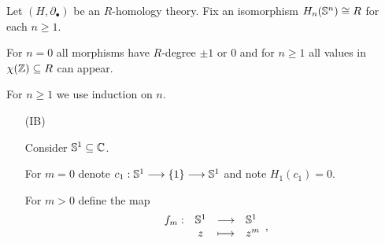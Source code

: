 	\begin{lemma}
		Let $(H,\partial_\bullet)$ be an $R$-homology theory. Fix an isomorphism $H_n(\S^n) \isom R$ for each $n \geq 1$.

		For $n = 0$ all morphisms have $R$-degree $\pm 1$ or $0$ and for $n \geq 1$  all values in $\chi(\Z) \subseteq R$ can appear. 
	\end{lemma}
	\begin{sketch}
		For $n \geq 1$ we use induction on $n$.
		\begin{enumerate}
			\item[(IB)]{
				Consider $\S^1 \subseteq \C$.

				For $m = 0$ denote $c_1: \S^1 --> \{1\} --> \S^1$ and note $H_1(c_1) = 0$.

				For $m > 0$ define the map 
				\begin{equation*}
					\begin{array}{rccl}
						f_m: &\S^1 &\longrightarrow& \S^1\\
						&z &\longmapsto& z^m
					\end{array},
				\end{equation*}




}
\end{enumerate}
\end{sketch}
